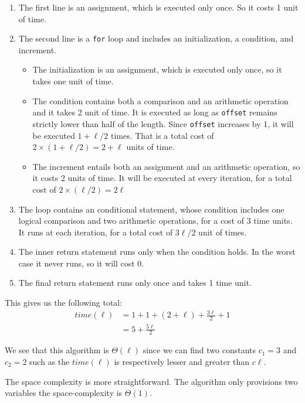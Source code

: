 \documentclass[11pt]{article}
\begin{document}
\begin{enumerate}
\item The first line is an assignment, which is executed only once. So
it costs 1 unit of time.

\item The second line is a \texttt{for} loop and includes an initialization,
a condition, and increment.
\begin{itemize}
\item The initialization is an assignment, which is executed only
once, so it takes one unit of time.
\item The condition contains both a comparison and an arithmetic
operation and it takes 2 unit of time. It is executed as long
as \texttt{offset} remains strictly lower than half of the
length. Since \texttt{offset} increases by 1, it will be executed
\(1 + \ell/2\) times. That is a total cost of \(2\times (1 + \ell/2) =
        2 + \ell\) units of time.
\item The increment entails both an assignment and an arithmetic
operation, so it costs 2 units of time. It will be executed at
every iteration, for a total cost of \(2 \times (\ell/2) = 2
        \ell\)
\end{itemize}

\item The loop contains an conditional statement, whose condition
includes one logical comparison and two arithmetic operations,
for a cost of 3 time units. It runs at each iteration, for a
total cost of \(3\ell/2\) unit of times.

\item The inner return statement runs only when the condition holds. In
the worst case it never runs, so it will cost 0.

\item The final return statement runs only once and takes 1 time unit.
\end{enumerate}

This gives us the following total:
\begin{align*}
    time(\ell) &= 1 + 1 + (2 + \ell) + \frac{3\ell}{2} + 1 \\
               &= 5 + \frac{5\ell}{2}
\end{align*}

We see that this algorithm is \(\Theta(\ell)\) since we can find
two constants \(c_1=3\) and \(c_2=2\) such as the \(time(\ell)\) is
respectively lesser and greater than \(c\ell\).

The space complexity is more straightforward. The algorithm only
provisions two variables the space-complexity is \(\Theta(1)\).
\end{document}
